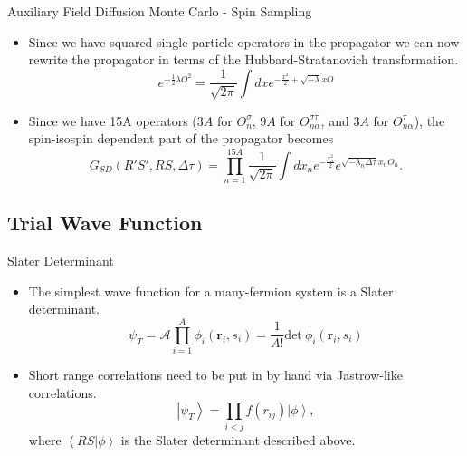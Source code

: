\documentclass{beamer}
\newcommand{\ket}[1]{\left| #1 \right>}
\newcommand{\braket}[2]{\left< #1 | #2 \right>}
\newcommand{\dt}{\Delta\tau}
\begin{document}
\begin{frame}{Auxiliary Field Diffusion Monte Carlo - Spin Sampling}
\begin{itemize}
   \item Since we have squared single particle operators in the propagator we can now rewrite the propagator in terms of the Hubbard-Stratanovich transformation.
   \begin{equation*}
      e^{-\frac{1}{2}\lambda O^2} = \frac{1}{\sqrt{2\pi}} \int dx e^{-\frac{x^2}{2} + \sqrt{-\lambda}xO}
   \end{equation*}
   \item Since we have 15A operators ($3A$ for $O_{n}^{\sigma}$, $9A$ for $O_{n\alpha}^{\sigma\tau}$, and $3A$ for $O_{n\alpha}^{\tau}$), the spin-isospin dependent part of the propagator becomes
   \begin{equation*}
      G_{SD}(R'S',RS,\dt) = \prod\limits_{n=1}^{15A}\frac{1}{\sqrt{2\pi}}\int dx_n e^{-\frac{x_n^2}{2}}e^{\sqrt{-\lambda_n\dt} x_nO_n}.
   \end{equation*}
\end{itemize}
\end{frame}

\subsection{Trial Wave Function}
\begin{frame}{Slater Determinant}
\begin{itemize}
   \item The simplest wave function for a many-fermion system is a Slater determinant.
   \begin{equation*}
      \psi_{T} = \mathcal{A} \prod\limits_{i=1}^A \phi_i(\mathbf{r}_i,s_i) = \frac{1}{A!} \mathrm{det}~\phi_i(\mathbf{r}_i,s_i)
   \end{equation*}
   \item Short range correlations need to be put in by hand via Jastrow-like correlations.
   \begin{equation*}
      \ket{\psi_T} = \prod\limits_{i<j}f(r_{ij}) \ket{\phi},
   \end{equation*}
   where $\braket{RS}{\phi}$ is the Slater determinant described above.
\end{itemize}
\end{frame}
\end{document}
